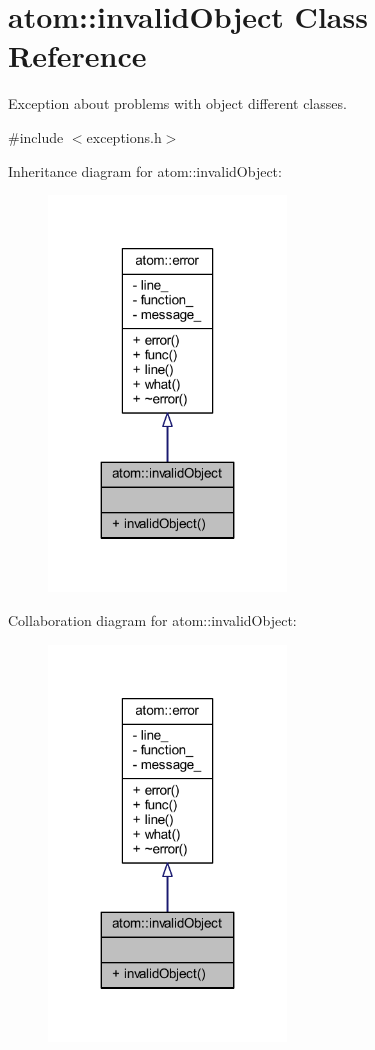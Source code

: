 \hypertarget{classatom_1_1invalid_object}{}\section{atom\+:\+:invalid\+Object Class Reference}
\label{classatom_1_1invalid_object}


Exception about problems with object different classes.  




{\ttfamily \#include $<$exceptions.\+h$>$}



Inheritance diagram for atom\+:\+:invalid\+Object\+:
\nopagebreak
\begin{figure}[H]
\begin{center}
\leavevmode
\includegraphics[width=179pt]{classatom_1_1invalid_object__inherit__graph}
\end{center}
\end{figure}


Collaboration diagram for atom\+:\+:invalid\+Object\+:
\nopagebreak
\begin{figure}[H]
\begin{center}
\leavevmode
\includegraphics[width=179pt]{classatom_1_1invalid_object__coll__graph}
\end{center}
\end{figure}
